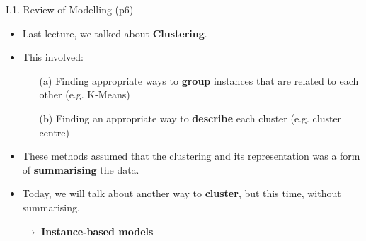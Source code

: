 \documentclass[handout]{beamer}
\newcommand{\strong}[1]{\textbf{\color{teal} #1}}
\newcommand{\stronger}[1]{\textbf{\color{purple} #1}}
\begin{document}
\begin{frame}{I.1. Review of Modelling (p6)}
\begin{itemize}
\item Last lecture, we talked about \stronger{Clustering}.
\item This involved:
	\begin{itemize}
	\item[(a)] Finding appropriate ways to \strong{group} instances that are related to each other (e.g. K-Means)
	\item[(b)] Finding an appropriate way to \strong{describe} each cluster (e.g. cluster centre)
	\end{itemize}
\item These methods assumed that the clustering and its representation was a form of \stronger{summarising} the data.
\item[]
\item Today, we will talk about another way to \strong{cluster}, but this time, without summarising.
\item[$\rightarrow$] \stronger{Instance-based models}
\end{itemize}
\end{frame}
\end{document}
